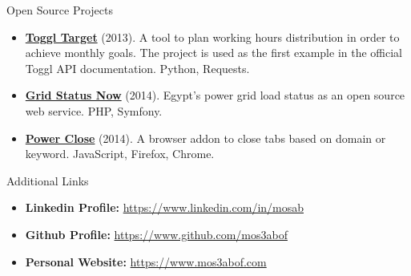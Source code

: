 \documentclass[]{mosabcv}
\begin{document}
	\begin{cvsection}{Open Source Projects}
		\begin{cvsubsection}{}{}{}
			\begin{itemize}
				\item \textbf{\href{https://github.com/mos3abof/toggl_target}{Toggl Target}} (2013). A tool to plan working hours distribution in order to achieve monthly goals. The project is used as the first example in the official Toggl API documentation. Python, Requests.
			
				\item \textbf{\href{https://www.gridstatusnow.com}{Grid Status Now}} (2014). Egypt's power grid load status as an open source web service. PHP, Symfony.
				
				\item \textbf{\href{https://power-close.com/}{Power Close}} (2014). A browser addon to close tabs based on domain or keyword. JavaScript, Firefox, Chrome.
			\end{itemize}
		\end{cvsubsection}
	\end{cvsection}


	\begin{cvsection}{Additional Links}
		\begin{cvsubsection}{}{}{}	
			\begin{itemize}
				\item \textbf{Linkedin Profile:} \href{https://www.linkedin.com/in/mosab}{https://www.linkedin.com/in/mosab}
				\item \textbf{Github Profile:} \href{https://www.github.com/mos3abof}{https://www.github.com/mos3abof}
				\item \textbf{Personal Website:} \href{https://www.mos3abof.com}{https://www.mos3abof.com}
			\end{itemize}
		\end{cvsubsection}
	\end{cvsection}
\end{document}
